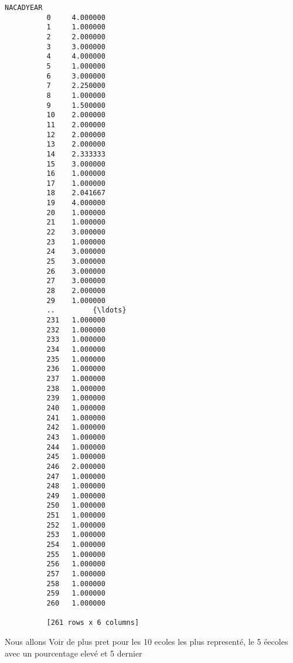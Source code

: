 \documentclass[11pt]{article}
\begin{document}
\begin{Verbatim}[commandchars=\\\{\}]
               NACADYEAR  
          0     4.000000  
          1     1.000000  
          2     2.000000  
          3     3.000000  
          4     4.000000  
          5     1.000000  
          6     3.000000  
          7     2.250000  
          8     1.000000  
          9     1.500000  
          10    2.000000  
          11    2.000000  
          12    2.000000  
          13    2.000000  
          14    2.333333  
          15    3.000000  
          16    1.000000  
          17    1.000000  
          18    2.041667  
          19    4.000000  
          20    1.000000  
          21    1.000000  
          22    3.000000  
          23    1.000000  
          24    3.000000  
          25    3.000000  
          26    3.000000  
          27    3.000000  
          28    2.000000  
          29    1.000000  
          ..         {\ldots}  
          231   1.000000  
          232   1.000000  
          233   1.000000  
          234   1.000000  
          235   1.000000  
          236   1.000000  
          237   1.000000  
          238   1.000000  
          239   1.000000  
          240   1.000000  
          241   1.000000  
          242   1.000000  
          243   1.000000  
          244   1.000000  
          245   1.000000  
          246   2.000000  
          247   1.000000  
          248   1.000000  
          249   1.000000  
          250   1.000000  
          251   1.000000  
          252   1.000000  
          253   1.000000  
          254   1.000000  
          255   1.000000  
          256   1.000000  
          257   1.000000  
          258   1.000000  
          259   1.000000  
          260   1.000000  
          
          [261 rows x 6 columns]
\end{Verbatim}
        
    Nous allons Voir de plus pret pour les 10 ecoles les plus representé, le
5 éecoles avec un pourcentage elevé et 5 dernier
\end{document}
